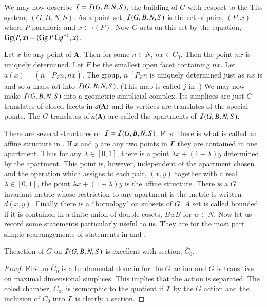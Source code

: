 We may now describe $\mathcal{I} = \mathcal{I}(G, B, N, S)$, the building of $G$ with respect to the Tits system, $(G, B, N, S)$. As a point set, $\mathcal{I}(G, B, N, S)$ is the set of pairs, $(P, x)$ where $P$ parahoric and $x \in \tau(P)$. Now $G$ acts on this set by the equation, $\operatorname{Gg} (P, x) = (\operatorname{Gg} P \operatorname{Gg}^{-1}, x)$. 

Let $x$ be any point of $\mathbf{A}$. Then for some $n \in N$, $nx \in \overline{C}_{0}$. Then the point $nx$ is uniquely determined. Let $F$ be the smallest open facet containing $nx$.  Let $a(x) = (n^{-1} P_{F}n, nx)$. The group, $n^{-1}P_{F}n$ is uniquely determined just as $nx$ is and so $a$ maps $bA$ into $\mathcal{I}(G, B, N, S)$. (This map is called $j$ in \cite{chap6-keyBT-I}.) We may now make $\mathcal{I}(G, B, N, S)$ into a geometric simplicial complex. Its simplices are just $G$ translates of closed facets in $a(\mathbf{A})$ and its vertices are translates of the special points. The $G$-translates of $a(\mathbf{A})$ are called the apartments of $\mathcal{I}(G, B, N, S)$.

There are several structures on $\mathcal{I} = \mathcal{I}(G, B, N, S)$. First there is what is called an affine structure in \cite{chap6-keyBT-I}. If $x$ and $y$ are any two points in $\mathcal{I}$ they are contained in one apartment. Thus for any $\lambda \in [0,1]$, there is a  point $\lambda x + (1- \lambda)y$ determined by the apartment. This point is, however, independent of the apartment chosen and the operation which assigns to each pair, $(x, y)$ together with a real $\lambda \in [0,1]$, the point $\lambda x + (1-\lambda)y$ is the affine structure. There is a $G$ invariant metric whose restriction to any apartment is the metric is written $d(x, y)$. Finally there is a ``bornology" on subsets of $G$. $A$ set is called bounded if it is contained in a finite union of double cosets, $BwB$ for $w \in N$. Now let us record some statements particularly useful to us. They are for the most part simple rearrangements of statements in \cite{chap6-keyBT-I} and \cite{chap6-keyBT-II}. 

\begin{seclem}\label{chap6-lemma-10.1}
The\pageoriginale action of $G$ on $\mathcal{I}(G, B, N, S)$ is excellent with section, $\overline{C}_{0}$.
\end{seclem}

\begin{proof}
First,m $\overline{C}_{0}$ is a fundamental domain for the $G$ action and $G$ is transitive on maximal dimensional simplices. This implies that the action is separated. The coled chamber, $\overline{C}_{0}$, is isomorphic to the quotient if $\mathcal{I}$ by the $G$ action and the inclusion of $\overline{C}_{0}$ into $\mathcal{I}$ is clearly a section.
\end{proof}

